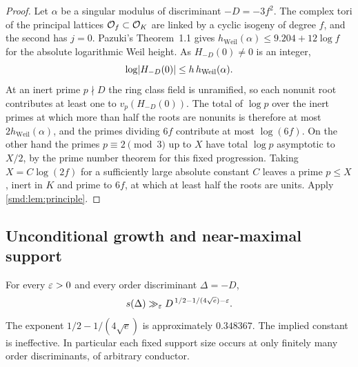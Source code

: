 
\begin{proof}
Let $\alpha$ be a singular modulus of discriminant $-D=-3f^2$. The complex tori of the
principal lattices $\mathcal{O}_f\subset\mathcal{O}_K$ are linked by a cyclic isogeny of degree $f$, and
the second has $j=0$. Pazuki's Theorem~1.1 \cite{Pazuki2016Modular} gives
$h_{\mathrm{Weil}}(\alpha)\le9.204+12\log f$ for the absolute logarithmic Weil height. As
$H_{-D}(0)\ne0$ is an integer,
\[
 \log\lvert H_{-D}(0)\rvert\le h\,h_{\mathrm{Weil}}(\alpha).
\]
At an inert prime $p\nmid D$ the ring class field is unramified, so each nonunit root
contributes at least one to $v_p(H_{-D}(0))$. The total of $\log p$ over the inert primes
at which more than half the roots are nonunits is therefore at most
$2h_{\mathrm{Weil}}(\alpha)$, and the primes dividing $6f$ contribute at most
$\log(6f)$. On the other hand the primes $p\equiv2\pmod3$ up to $X$ have total
$\log p$ asymptotic to $X/2$, by the prime number theorem for this fixed progression.
Taking $X=C\log(2f)$ for a sufficiently large absolute constant $C$ leaves a prime
$p\le X$, inert in $K$ and prime to $6f$, at which at least half the roots are units.
Apply \cref{smd:lem:principle}.
\end{proof}

\subsection{Unconditional growth and near-maximal support}\label{smd:sec:uncond}
{\raggedright{}}

\begin{theorem}\label{smd:thm:uncond}
For every $\varepsilon>0$ and every order discriminant $\Delta=-D$,
\[
 s(\Delta)\gg_\varepsilon D^{\,1/2-1/(4\sqrt e)-\varepsilon}.
\]
The exponent $1/2-1/(4\sqrt e)$ is approximately $0.348367$. The implied constant is
ineffective. In particular each fixed support size occurs at only finitely many order
discriminants, of arbitrary conductor.
\end{theorem}


